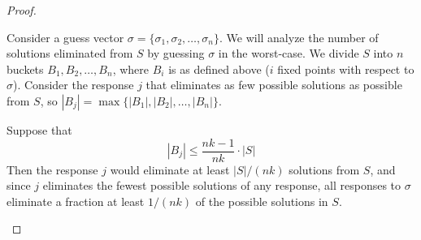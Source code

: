 \documentclass[12pt, a4paper]{article}
\begin{document}
\begin{enumerate}
\begin{proof}
\begin{enumerate}[label=]
			Consider a guess vector $\sigma=\{\sigma_1, \sigma_2, \ldots, \sigma_n\}$.
			We will analyze the number of solutions
			eliminated from $S$ by guessing $\sigma$ in the worst-case. We divide $S$
			into $n$ buckets $B_1, B_2, \ldots, B_n$, where $B_i$ is as defined above
			($i$ fixed points with respect to $\sigma$). Consider the response $j$
			that eliminates as few possible solutions as possible from $S$,
			so $|B_j| = \max\{|B_1|, |B_2|, \ldots, |B_n|\}$.
			
			Suppose that
				\begin{equation*}
				|B_j|\le\frac{nk - 1}{nk}\cdot|S|
				\end{equation*}
			Then the response $j$ would eliminate at least $|S|/(nk)$ solutions from
			$S$, and since $j$ eliminates the fewest possible solutions of any
			response, all responses to $\sigma$ eliminate a fraction at least
			$1/(nk)$ of the possible solutions in $S$.
			

\end{enumerate}
\end{proof}
\end{enumerate}
\end{document}
